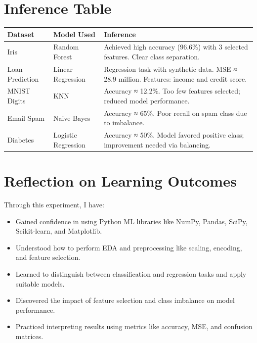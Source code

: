 \documentclass{article}
\begin{document}
\section{Inference Table}
\label{sec:InferenceTable}

\begin{longtable}{|p{4cm}|p{4cm}|p{6cm}|}
\hline
\textbf{Dataset} & \textbf{Model Used} & \textbf{Inference} \\
\hline
Iris & Random Forest & Achieved high accuracy (96.6\%) with 3 selected features. Clear class separation. \\
\hline
Loan Prediction & Linear Regression & Regression task with synthetic data. MSE ≈ 28.9 million. Features: income and credit score. \\
\hline
MNIST Digits & KNN & Accuracy ≈ 12.2\%. Too few features selected; reduced model performance. \\
\hline
Email Spam & Naive Bayes & Accuracy ≈ 65\%. Poor recall on spam class due to imbalance. \\
\hline
Diabetes & Logistic Regression & Accuracy ≈ 50\%. Model favored positive class; improvement needed via balancing. \\
\hline
\end{longtable}

\section{Reflection on Learning Outcomes}
\label{sec:Reflection}

Through this experiment, I have:
\begin{itemize}
    \item Gained confidence in using Python ML libraries like NumPy, Pandas, SciPy, Scikit-learn, and Matplotlib.
    \item Understood how to perform EDA and preprocessing like scaling, encoding, and feature selection.
    \item Learned to distinguish between classification and regression tasks and apply suitable models.
    \item Discovered the impact of feature selection and class imbalance on model performance.
    \item Practiced interpreting results using metrics like accuracy, MSE, and confusion matrices.
\end{itemize}
\end{document}
